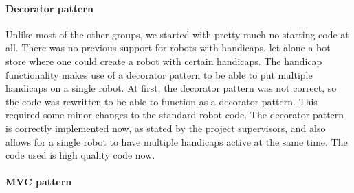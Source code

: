 \documentclass[]{article}
\begin{document}
\paragraph{Decorator pattern}
Unlike most of the other groups, we started with pretty much no starting code at all. There was no previous support for robots with handicaps, let alone a bot store where one could create a robot with certain handicaps. The handicap functionality makes use of a decorator pattern to be able to put multiple handicaps on a single robot. At first, the decorator pattern was not correct, so the code was rewritten to be able to function as a decorator pattern. This required some minor changes to the standard robot code. The decorator pattern is correctly implemented now, as stated by the project supervisors, and also allows for a single robot to have multiple handicaps active at the same time. The code used is high quality code now.
\paragraph{MVC pattern}
\end{document}
